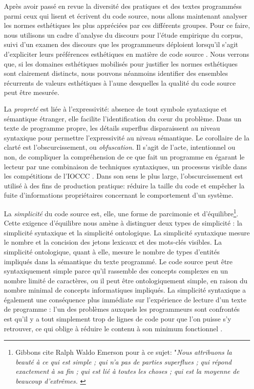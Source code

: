 \documentclass{article}
\begin{document}
Après avoir passé en revue la diversité des pratiques et des textes programméss parmi ceux qui lisent et écrivent du code source, nous allons maintenant analyser les normes esthétiques les plus appréciées par ces différents groupes. Pour ce faire, nous utilisons un cadre d'analyse du discours pour l'étude empirique du corpus, suivi d'un examen des discours que les programmeurs déploient lorsqu'il s'agit d'expliciter leurs préférences esthétiques en matière de code source \citep{mullet_general_2018a}. Nous verrons que, si les domaines esthétiques mobilisés pour justifier les normes esthétiques sont clairement distincts, nous pouvons néanmoins identifier des ensembles récurrents de valeurs esthétiques à l'aune desquelles la qualité du code source peut être mesurée.

La \emph{propreté} est liée à l'expressivité: absence de tout symbole syntaxique et sémantique étranger, elle facilite l'identification du cœur du problème. Dans un texte de programme propre, les détails superflus disparaissent au niveau syntaxique pour permettre l'expressivité au niveau sémantique. Le corollaire de la clarté est l'obscurcissement, ou \emph{obfuscation}. Il s'agit de l'acte, intentionnel ou non, de compliquer la compréhension de ce que fait un programme en égarant le lecteur par une combinaison de techniques syntaxiques, un processus visible dans les compétitions de l'IOCCC \citep{mateas_box_2005}. Dans son sens le plus large, l'obscurcissement est utilisé à des fins de production pratique: réduire la taille du code et empêcher la fuite d'informations propriétaires concernant le comportement d'un système.

La \emph{simplicité} du code source est, elle, une forme de parcimonie et d'équilibre\footnote{Gibbons cite Ralph Waldo Emerson pour à ce sujet: "\emph{Nous attribuons la beauté à ce qui est simple ; qui n'a pas de parties superflues ; qui répond exactement à sa fin ; qui est lié à toutes les choses ; qui est la moyenne de beaucoup d'extrêmes. \citep{gibbons_beauty_2012}}}. Cette exigence d'équilibre nous amène à distinguer deux types de simplicité : la simplicité syntaxique et la simplicité ontologique. La simplicité syntaxique mesure le nombre et la concision des jetons lexicaux et des mots-clés visibles. La simplicité ontologique, quant à elle, mesure le nombre de types d'entités impliqués dans la sémantique du texte programmé. Le code source peut être syntaxiquement simple parce qu'il rassemble des concepts complexes en un nombre limité de caractères, ou il peut être ontologiquement simple, en raison du nombre minimal de concepts informatiques impliqués. La simplicité syntaxique a également une conséquence plus immédiate sur l'expérience de lecture d'un texte de programme : l'un des problèmes auxquels les programmeurs sont confrontés est qu'il y a tout simplement trop de lignes de code pour que l'on puisse s'y retrouver, ce qui oblige à réduire le contenu à son minimum fonctionnel \citep{butler_programmer_2012}.
\end{document}
